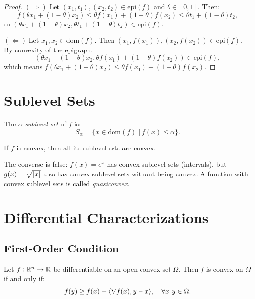 \begin{proof}
$(\Rightarrow)$ Let $(x_1, t_1), (x_2, t_2) \in \mathrm{epi}(f)$ and
$\theta \in [0,1]$. Then:
\[
    f(\theta x_1 + (1-\theta)x_2) \leq \theta f(x_1) + (1-\theta)f(x_2)
    \leq \theta t_1 + (1-\theta)t_2,
\]
so $(\theta x_1 + (1-\theta)x_2, \theta t_1 + (1-\theta)t_2) \in \mathrm{epi}(f)$.

$(\Leftarrow)$ Let $x_1, x_2 \in \mathrm{dom}(f)$. Then
$(x_1, f(x_1)), (x_2, f(x_2)) \in \mathrm{epi}(f)$. By convexity of the epigraph:
\[
    (\theta x_1 + (1-\theta)x_2, \theta f(x_1) + (1-\theta)f(x_2)) \in \mathrm{epi}(f),
\]
which means $f(\theta x_1 + (1-\theta)x_2) \leq \theta f(x_1) + (1-\theta)f(x_2)$.
\end{proof}

\section{Sublevel Sets}

\begin{definition}
The \emph{$\alpha$-sublevel set} of $f$ is:
\[
    S_\alpha = \{x \in \mathrm{dom}(f) \mid f(x) \leq \alpha\}.
\]
\end{definition}

\begin{proposition}
If $f$ is convex, then all its sublevel sets are convex.
\end{proposition}

\begin{warning}[title=\textbf{Converse is False}]
The converse is false: $f(x) = e^x$ has convex sublevel sets (intervals), but
$g(x) = \sqrt{\left| x \right|}$ also has convex sublevel sets without being convex. A function
with convex sublevel sets is called \emph{quasiconvex}.
\end{warning}

\section{Differential Characterizations}

\subsection{First-Order Condition}

\begin{theorem}
\label{thm:first_order}
Let $f : \mathbb{R}^n \to \mathbb{R}$ be differentiable on an open convex set $\Omega$. Then $f$ is
convex on $\Omega$ if and only if:
\[
    f(y) \geq f(x) + \langle \nabla f(x), y - x \rangle, \quad \forall x, y \in \Omega.
\]
\end{theorem}


